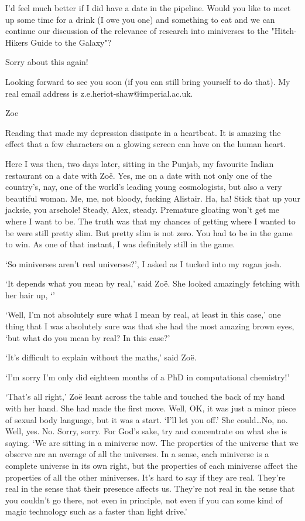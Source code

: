I'd feel much better if I did have a date in the pipeline. Would you
like to meet up some time for a drink (I owe you one) and something to eat and we
can continue our discussion of the relevance of research into
miniverses to the "Hitch-Hikers Guide to the Galaxy"?

Sorry about this again!

Looking forward to see you soon (if you can still bring yourself to
do that). My real email address is z.e.heriot-shaw@imperial.ac.uk.

Zoe
\stopmessage

Reading that made my depression dissipate in a heartbeat. It is
amazing the effect that a few characters on a glowing screen can
have on the human heart.

Here I was then, two days later, sitting in the Punjab, my favourite
Indian restaurant on a date with Zoë. Yes, {\twelveit me\/} on
a date with not only one of the country's, nay, one of the
{\twelveit world's\/} leading young cosmologists, but also a very
beautiful woman. Me, {\twelveit me}, not bloody, fucking Alistair.
Ha, ha! Stick that up your jacksie, you arsehole! Steady, Alex,
steady. Premature gloating won't get me where I want to be. The
truth was that my chances of getting where I wanted to be were still
pretty slim. But pretty slim is not zero. You had to be in the game
to win. As one of that instant, I was definitely still in the game.

`So miniverses aren't real universes?', I asked as I tucked into my
rogan josh.

`It depends what you mean by real,' said Zoë. She looked
amazingly fetching with her hair up, `'

`Well, I'm not absolutely sure what {\twelveit I\/} mean by real, at
least in this case,' one thing that I was absolutely sure was that
she had the most amazing brown eyes, `but what do {\twelveit you\/}
mean by real? In this case?'

`It's difficult to explain without the maths,' said Zoë.

`I'm sorry I'm only did eighteen months of a PhD in computational
chemistry!'

`That's all right,' Zoë leant across the table and touched the
back of my hand with her hand. She had made the first move. Well,
OK, it was just a minor piece of sexual body language, but it was a
start. `I'll let you off.' She could\dots No, no. Well, yes. No.
Sorry, sorry. For God's sake, {\twelveit try\/} and concentrate on
what she is saying. `We are sitting in a miniverse now. The
properties of the universe that we observe are an average of all the
universes. In a sense, each miniverse is a complete universe in its
own right, but the properties of each miniverse affect the
properties of all the other miniverses. It's hard to say if they are
real. They're real in the sense that their presence affects us.
They're not real in the sense that you couldn't go there, not even
in principle, not even if you can some kind of magic technology such
as a faster than light drive.'

